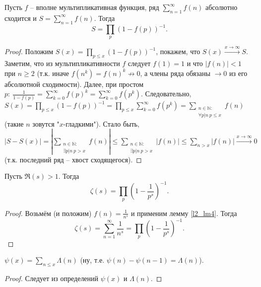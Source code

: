 
\begin{lemma} \label{l2_lm4}
	Пусть $f$ -- вполне мультипликативная функция, ряд $\displaystyle \sum\limits_{n=1}^\infty f(n)$ абсолютно сходится и $\displaystyle S = \sum\limits_{n=1}^\infty f(n)$. Тогда 
	$$S = \prod\limits_p(1-f(p))^{-1}.$$
\end{lemma}
\begin{proof}
	Положим $\displaystyle S(x) = \prod\limits_{p \leq x}(1-f(p))^{-1}$, покажем, что $S(x) \xrightarrow{x\to\infty} S$. Заметим, что из мультипликативности $f$ следует $f(1) = 1$ и что $|f(n)|<1$ при $n \geq 2$ (т.к. иначе $f(n^k)=f(n)^k \not \to 0$, а члены ряда обязаны $\to 0$ из его абсолютной сходимости). Далее, при простом $\displaystyle p: \ \frac{1}{1-f(p)} = \sum\limits_{k=0}^\infty f(p)^k = \sum\limits_{k=0}^\infty f(p^k)$. Следовательно, $\displaystyle S(x) = \prod\limits_{p\leq x} (1-f(p))^{-1} = \prod\limits_{p\leq x}\sum\limits_{k=0}^\infty f(p^k) = \sum\limits_{\substack{n\in\mathbb{N}: \\ \forall p|n \ p \leq x}}f(n)$ (такие $n$ зовутся "$x$-гладкими"). Стало быть, $\displaystyle \left|S-S(x)\right|=\left|\sum\limits_{\substack{n\in\mathbb{N}: \\ \exists p|n \ p > x}}f(n)\right| \leq \sum\limits_{\substack{n\in\mathbb{N}: \\ \exists p|n \ p > x}}\left|f(n)\right| \leq \sum\limits_{n>x}\left|f(n)\right| \xrightarrow{x\to\infty} 0$ (т.к. последний ряд -- хвост сходящегося).
\end{proof}

\begin{theorem} \label{l2_Euler_formula}
	Пусть $\Re(s)>1$. Тогда $$\zeta(s) = \prod\limits_p\left( 1-\frac{1}{p^s}\right)^{-1}.$$
\end{theorem}
\begin{proof} 
	Возьмём (и положим) $\displaystyle f(n) = \frac{1}{n^s}$ и применим лемму \ref{l2_lm4}. Тогда 
		$$\zeta(s) = \sum\limits_{n=1}^\infty \frac{1}{n^s} = \prod\limits_p\left( 1-\frac{1}{p^s} \right)^{-1}.$$
\end{proof}

\begin{lemma} \label{l2_lm5}
	$\displaystyle \psi(x) = \sum\limits_{n \leq x} \Lambda(n)$ (ну, т.е. $\psi(n)-\psi(n-1)=\Lambda(n)$).
\end{lemma}
\begin{proof}
	Следует из определений $\psi(x)$ и $\Lambda(n)$.
\end{proof}
